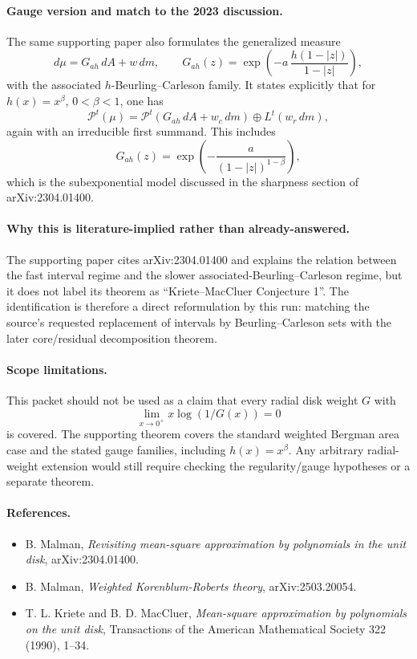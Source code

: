 \documentclass[11pt]{article}
\newcommand{\Po}{\mathcal P}
\begin{document}
\paragraph{Gauge version and match to the 2023 discussion.}
The same supporting paper also formulates the generalized measure
\[
d\mu=G_{ah}\,dA+w\,dm,\qquad
G_{ah}(z)=\exp\!\left(-a\,\frac{h(1-|z|)}{1-|z|}\right),
\]
with the associated \(h\)-Beurling--Carleson family.  It states explicitly
that for \(h(x)=x^\beta\), \(0<\beta<1\), one has
\[
\Po^t(\mu)=
\Po^t(G_{ah}\,dA+w_c\,dm)\oplus L^t(w_r\,dm),
\]
again with an irreducible first summand.  This includes
\[
G_{ah}(z)=\exp\!\left(-\frac{a}{(1-|z|)^{1-\beta}}\right),
\]
which is the subexponential model discussed in the sharpness section of
arXiv:2304.01400.

\paragraph{Why this is literature-implied rather than already-answered.}
The supporting paper cites arXiv:2304.01400 and explains the relation between
the fast interval regime and the slower associated-Beurling--Carleson regime,
but it does not label its theorem as ``Kriete--MacCluer Conjecture 1''.  The
identification is therefore a direct reformulation by this run: matching the
source's requested replacement of intervals by Beurling--Carleson sets with
the later core/residual decomposition theorem.

\paragraph{Scope limitations.}
This packet should not be used as a claim that every radial disk weight \(G\)
with
\[
\lim_{x\to0^+}x\log(1/G(x))=0
\]
is covered.  The supporting theorem covers the standard weighted Bergman area
case and the stated gauge families, including \(h(x)=x^\beta\).  Any arbitrary
radial-weight extension would still require checking the regularity/gauge
hypotheses or a separate theorem.

\paragraph{References.}
\begin{itemize}
\item B. Malman, \emph{Revisiting mean-square approximation by polynomials in
the unit disk}, arXiv:2304.01400.
\item B. Malman, \emph{Weighted Korenblum-Roberts theory}, arXiv:2503.20054.
\item T. L. Kriete and B. D. MacCluer, \emph{Mean-square approximation by
polynomials on the unit disk}, Transactions of the American Mathematical
Society 322 (1990), 1--34.
\end{itemize}
\end{document}
